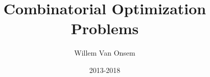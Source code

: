 \documentclass{../SharedData/dictionaryclass}
\title{Combinatorial Optimization Problems}
\author{Willem Van Onsem}
\date{2013-2018}
\begin{document}
\glsaddall
\printglossaries
\end{document}
